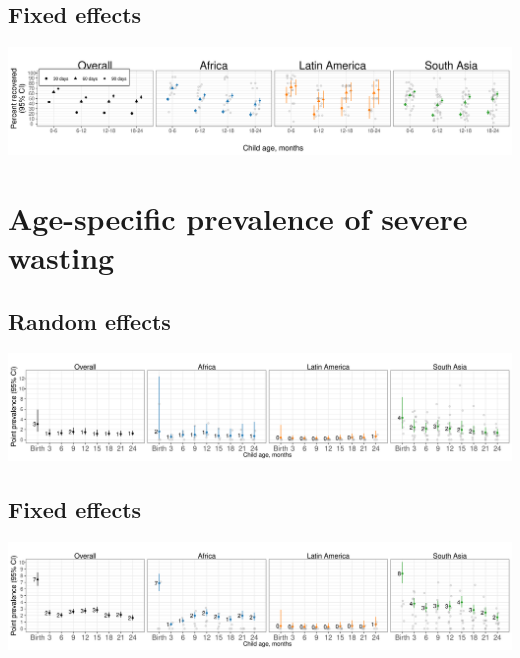\documentclass[
  9pt,
]{book}
\begin{document}
\hypertarget{fixed-effects-4}{%
\subsection{Fixed effects}\label{fixed-effects-4}}

\includegraphics[width=58.33in]{figures/wasting/FE/fig-wast-2-rec-overall_region--allage-primary_FE}

\hypertarget{age-specific-prevalence-of-severe-wasting}{%
\section{Age-specific prevalence of severe wasting}\label{age-specific-prevalence-of-severe-wasting}}

\hypertarget{random-effects-4}{%
\subsection{Random effects}\label{random-effects-4}}

\includegraphics[width=58.33in]{figures/wasting/fig-wast-3-prev-overall_region--allage-primary}

\hypertarget{fixed-effects-5}{%
\subsection{Fixed effects}\label{fixed-effects-5}}

\includegraphics[width=58.33in]{figures/wasting/FE/fig-wast-3-prev-overall_region--allage-primary_FE}
\end{document}
